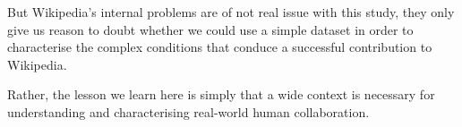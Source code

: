 But Wikipedia's internal problems are of not real issue with this
study, they only give us reason to doubt whether we could use a simple
dataset in order to characterise the complex conditions that conduce a
successful contribution to Wikipedia.

Rather, the lesson we learn here is simply that a wide context is
necessary for understanding and characterising real-world human
collaboration.

